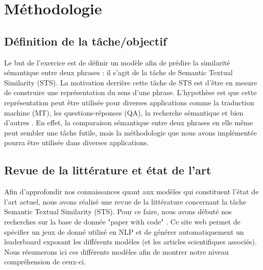 \documentclass[11pt,a4paper, french]{article}
\begin{document}
%

\section{Méthodologie}


\subsection{Définition de la tâche/objectif}
Le but de l’exercice est de définir un modèle afin de prédire la similarité sémantique entre deux phrases : il s'agit de la tâche de Semantic Textual Similarity (STS). La motivation derrière cette tâche de STS est d’être en mesure de construire une représentation du sens d’une phrase. L’hypothèse est que cette représentation peut être utilisée pour diverses applications comme la traduction machine (MT), les questions-réponses (QA), la recherche sémantique et bien d’autres \cite{Cer_2017}. En effet, la comparaison sémantique entre deux phrases en elle même peut sembler une tâche futile, mais la méthodologie que nous avons implémentée pourra être utilisée dans diverses applications.

\subsection{Revue de la littérature et état de l'art}
Afin d'approfondir nos connaissances quant aux modèles qui constituent l'état de l'art actuel, nous avons réalisé une revue de la littérature concernant la tâche Semantic Textual Similarity (STS). Pour ce faire, nous avons débuté nos recherches sur la base de donnée "paper with code" \cite{sota}. Ce site web permet de spécifier un jeux de donné utilisé en NLP et de générer automatiquement un leaderboard exposant les différents modèles (et les articles scientifiques associés). Nous résumerons ici ces différents modèles afin de montrer notre niveau compréhension de ceux-ci. 
\end{document}
